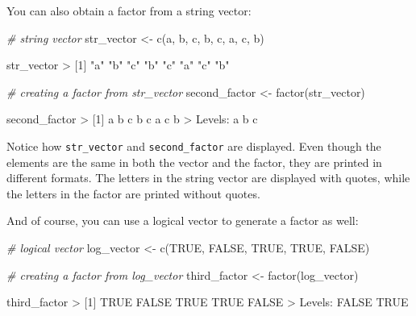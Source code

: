 \documentclass[
]{book}
\newenvironment{Shaded}{\begin{snugshade}}{\end{snugshade}}
\newcommand{\CommentTok}[1]{\textcolor[rgb]{0.56,0.35,0.01}{\textit{#1}}}
\newcommand{\ConstantTok}[1]{\textcolor[rgb]{0.00,0.00,0.00}{#1}}
\newcommand{\DecValTok}[1]{\textcolor[rgb]{0.00,0.00,0.81}{#1}}
\newcommand{\FunctionTok}[1]{\textcolor[rgb]{0.00,0.00,0.00}{#1}}
\newcommand{\NormalTok}[1]{#1}
\newcommand{\OtherTok}[1]{\textcolor[rgb]{0.56,0.35,0.01}{#1}}
\newcommand{\SpecialCharTok}[1]{\textcolor[rgb]{0.00,0.00,0.00}{#1}}
\newcommand{\StringTok}[1]{\textcolor[rgb]{0.31,0.60,0.02}{#1}}
\begin{document}
You can also obtain a factor from a string vector:

\begin{Shaded}
\begin{Highlighting}[]
\CommentTok{\# string vector}
\NormalTok{str\_vector }\OtherTok{\textless{}{-}} \FunctionTok{c}\NormalTok{(}\StringTok{\textquotesingle{}a\textquotesingle{}}\NormalTok{, }\StringTok{\textquotesingle{}b\textquotesingle{}}\NormalTok{, }\StringTok{\textquotesingle{}c\textquotesingle{}}\NormalTok{, }\StringTok{\textquotesingle{}b\textquotesingle{}}\NormalTok{, }\StringTok{\textquotesingle{}c\textquotesingle{}}\NormalTok{, }\StringTok{\textquotesingle{}a\textquotesingle{}}\NormalTok{, }\StringTok{\textquotesingle{}c\textquotesingle{}}\NormalTok{, }\StringTok{\textquotesingle{}b\textquotesingle{}}\NormalTok{)}

\NormalTok{str\_vector}
\SpecialCharTok{\textgreater{}}\NormalTok{ [}\DecValTok{1}\NormalTok{] }\StringTok{"a"} \StringTok{"b"} \StringTok{"c"} \StringTok{"b"} \StringTok{"c"} \StringTok{"a"} \StringTok{"c"} \StringTok{"b"}

\CommentTok{\# creating a factor from str\_vector}
\NormalTok{second\_factor }\OtherTok{\textless{}{-}} \FunctionTok{factor}\NormalTok{(str\_vector)}

\NormalTok{second\_factor}
\SpecialCharTok{\textgreater{}}\NormalTok{ [}\DecValTok{1}\NormalTok{] a b c b c a c b}
\SpecialCharTok{\textgreater{}}\NormalTok{ Levels}\SpecialCharTok{:}\NormalTok{ a b c}
\end{Highlighting}
\end{Shaded}

Notice how \texttt{str\_vector} and \texttt{second\_factor} are displayed. Even though the
elements are the same in both the vector and the factor, they are printed in
different formats. The letters in the string vector are displayed with quotes,
while the letters in the factor are printed without quotes.

And of course, you can use a logical vector to generate a factor as well:

\begin{Shaded}
\begin{Highlighting}[]
\CommentTok{\# logical vector}
\NormalTok{log\_vector }\OtherTok{\textless{}{-}} \FunctionTok{c}\NormalTok{(}\ConstantTok{TRUE}\NormalTok{, }\ConstantTok{FALSE}\NormalTok{, }\ConstantTok{TRUE}\NormalTok{, }\ConstantTok{TRUE}\NormalTok{, }\ConstantTok{FALSE}\NormalTok{)}

\CommentTok{\# creating a factor from log\_vector}
\NormalTok{third\_factor }\OtherTok{\textless{}{-}} \FunctionTok{factor}\NormalTok{(log\_vector)}

\NormalTok{third\_factor}
\SpecialCharTok{\textgreater{}}\NormalTok{ [}\DecValTok{1}\NormalTok{] }\ConstantTok{TRUE}  \ConstantTok{FALSE} \ConstantTok{TRUE}  \ConstantTok{TRUE}  \ConstantTok{FALSE}
\SpecialCharTok{\textgreater{}}\NormalTok{ Levels}\SpecialCharTok{:} \ConstantTok{FALSE} \ConstantTok{TRUE}
\end{Highlighting}
\end{Shaded}
\end{document}

